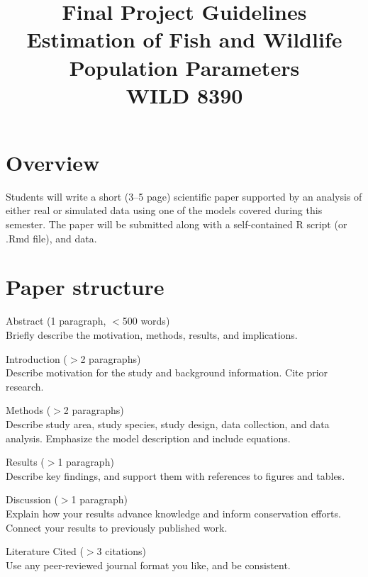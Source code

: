 \documentclass[12pt]{article}
\title{Final Project Guidelines \\ Estimation of Fish and Wildlife Population Parameters \\ WILD 8390}
\date{}
\begin{document}

\maketitle

\vspace{-48pt}

\section*{Overview}

Students will write a short (3--5 page) scientific paper supported by
an analysis of either real or simulated data using one of the models
covered during this semester. The paper will be submitted
along with a self-contained R script (or .Rmd file), and data.


\section*{Paper structure}

Abstract (1 paragraph, $<$500 words) \\
Briefly describe the motivation, methods, results, and
implications. %
\vspace{6pt}

Introduction ($>$2 paragraphs) \\
Describe motivation for the study and background information. Cite
prior research. 
\vspace{6pt}

Methods  ($>$2 paragraphs) \\
Describe study area, study species, study design, data collection, and
data analysis. Emphasize the model description and include equations.
\vspace{6pt}

Results  ($>$1 paragraph) \\
Describe key findings, and support them with references to figures and tables.
\vspace{6pt}

Discussion  ($>$1 paragraph) \\
Explain how your results advance knowledge and inform conservation
efforts. Connect your results to previously published work.
\vspace{6pt}

Literature Cited  ($>$3 citations) \\
Use any peer-reviewed journal format you like, and be consistent.
\end{document}

